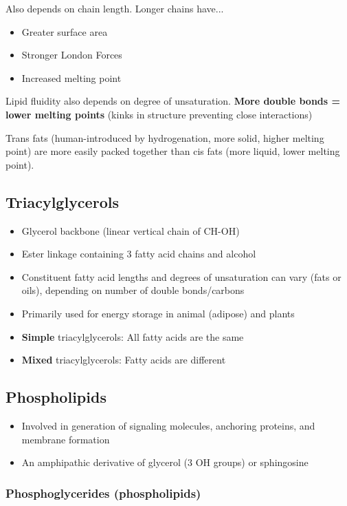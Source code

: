 \documentclass[letterpaper, 12pt]{article}
\begin{document}
Also depends on chain length. Longer chains have...

\begin{itemize}
\item Greater surface area
\item Stronger London Forces
\item Increased melting point
\end{itemize}

Lipid fluidity also depends on degree of unsaturation. \textbf{More double bonds = lower melting points} (kinks in structure preventing close interactions)

Trans fats (human-introduced by hydrogenation, more solid, higher melting point) are more easily packed together than cis fats (more liquid, lower melting point).

\subsection*{Triacylglycerols}
\begin{itemize}
\item Glycerol backbone (linear vertical chain of CH-OH)
\item Ester linkage containing 3 fatty acid chains and alcohol
\item Constituent fatty acid lengths and degrees of unsaturation can vary (fats or oils), depending on number of double bonds/carbons
\item Primarily used for energy storage in animal (adipose) and plants
\item \textbf{Simple} triacylglycerols: All fatty acids are the same
\item \textbf{Mixed} triacylglycerols: Fatty acids are different
\end{itemize}

\subsection*{Phospholipids}
\begin{itemize}
\item Involved in generation of signaling molecules, anchoring proteins, and membrane formation
\item An amphipathic derivative of glycerol (3 OH groups) or sphingosine
\end{itemize}

\subsubsection*{Phosphoglycerides (phospholipids)}
\end{document}
